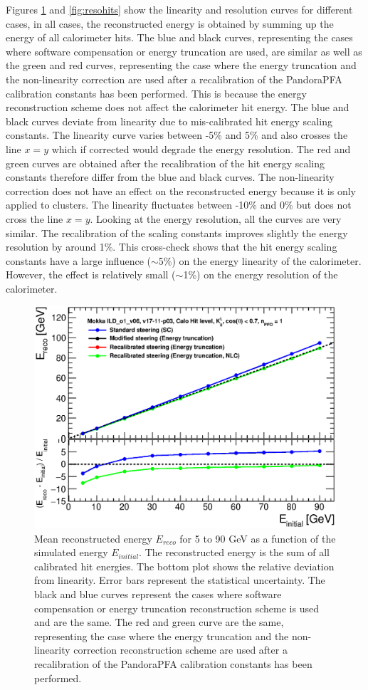Figures \ref{fig:linhits} and \ref{fig:resohits} show the linearity and resolution curves for different cases, in all cases, the reconstructed energy is obtained by summing up the energy of all calorimeter hits. The blue and black curves, representing the cases where software compensation or energy truncation are used, are similar as well as the green and red curves, representing the case where the energy truncation and the non-linearity correction are used after a recalibration of the PandoraPFA calibration constants has been performed. This is because the energy reconstruction scheme does not affect the calorimeter hit energy. The blue and black curves deviate from linearity due to mis-calibrated hit energy scaling constants. The linearity curve varies between -5\% and 5\% and also crosses the line $x=y$ which if corrected would degrade the energy resolution. The red and green curves are obtained after the recalibration of the hit energy scaling constants therefore differ from the blue and black curves. The non-linearity correction does not have an effect on the reconstructed energy because it is only applied to clusters. The linearity fluctuates between -10\% and 0\% but does not cross the line $x=y$. Looking at the energy resolution, all the curves are very similar. The recalibration of the scaling constants improves slightly the energy resolution by around 1\%. This cross-check shows that the hit energy scaling constants have a large influence ($\sim$5\%) on the energy linearity of the calorimeter. However, the effect is relatively small ($\sim$1\%) on the energy resolution of the calorimeter.

\begin{figure}[htbp!]
  \centering
  \includegraphics[width=0.6\linewidth]{../Thesis_Plots/ILD/CheckCalib/Comparison_linearity_Curves_Hits.eps}
  \caption{Mean reconstructed energy $E_{reco}$ for 5 to 90 GeV \kzeroL{} as a function of the simulated energy $E_{initial}$. The reconstructed energy is the sum of all calibrated hit energies. The bottom plot shows the relative deviation from linearity. Error bars represent the statistical uncertainty. The black and blue curves represent the cases where software compensation or energy truncation reconstruction scheme is used and are the same. The red and green curve are the same, representing the case where the energy truncation and the non-linearity correction reconstruction scheme are used after a recalibration of the PandoraPFA calibration constants has been performed.} \label{fig:linhits}
\end{figure}

